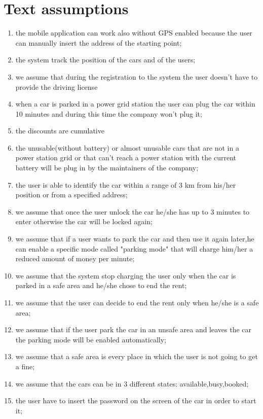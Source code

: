 \section{Text assumptions}
\begin{enumerate}
	\item the mobile application can work also without GPS enabled because the user can manually insert the address of the starting point;
	\item the system track the position of the cars and of the users;
	\item we assume that during the registration to the system the user doesn't have to provide the driving license
	\item when a car is parked in a power grid station the user can plug the car within 10 minutes and during this time the company won't plug it;
	\item the discounts are cumulative
	\item the unusable(without battery) or almost unusable cars that are not in a power station grid or that can't reach a power station with the current battery will be plug in by the maintainers of the company;
	\item the user is able to identify the car within a range of 3 km from his/her position or from a specified address;
	\item we assume that once the user unlock the car he/she has up to 3 minutes to enter otherwise the car will be locked again;
	\item we assume that if a user wants to park the car and then use it again later,he can enable a specific mode called "parking mode" that will charge him/her a reduced amount of money per minute;
	\item we assume that the system stop charging the user only when the car is parked in a safe area and he/she chose to end the rent;
	\item we assume that the user can decide to end the rent only when he/she is a safe area;
	\item we assume that if the user park the car in an unsafe area and leaves the car the parking mode will be enabled automatically;
	\item we assume that a safe area is every  place in which the user is not going to get a fine;
	\item we assume that the cars can be in 3 different states: available,busy,booked;
	\item the user have to insert the password on the screen of the car in order to start it;

\end{enumerate}
